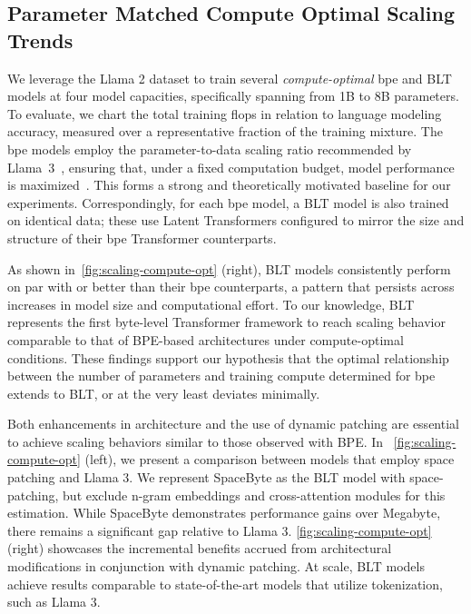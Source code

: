 \subsection{Parameter Matched Compute Optimal Scaling Trends}
\label{section:parameter-matched-scaling}
We leverage the Llama 2 dataset to train several \textit{compute-optimal} bpe and {\textsc BLT} models at four model capacities, specifically spanning from 1B to 8B parameters. To evaluate, we chart the total training flops in relation to language modeling accuracy, measured over a representative fraction of the training mixture. The bpe models employ the parameter-to-data scaling ratio recommended by Llama~3~\citep{dubey2024llama}, ensuring that, under a fixed computation budget, model performance is maximized~\citep{hoffmann2022training}. This forms a strong and theoretically motivated baseline for our experiments. Correspondingly, for each bpe model, a {\textsc BLT} model is also trained on identical data; these use Latent Transformers configured to mirror the size and structure of their bpe Transformer counterparts.

As shown in~\autoref{fig:scaling-compute-opt} (right), {\textsc BLT} models consistently perform on par with or better than their bpe counterparts, a pattern that persists across increases in model size and computational effort. To our knowledge, {\textsc BLT} represents the first byte-level Transformer framework to reach scaling behavior comparable to that of BPE-based architectures under compute-optimal conditions. These findings support our hypothesis that the optimal relationship between the number of parameters and training compute determined for bpe extends to {\textsc BLT}, or at the very least deviates minimally.

Both enhancements in architecture and the use of dynamic patching are essential to achieve scaling behaviors similar to those observed with BPE. In ~\autoref{fig:scaling-compute-opt} (left), we present a comparison between models that employ space patching and Llama 3. We represent SpaceByte \citep{slagle2024spacebyte} as the {\textsc BLT} model with space-patching, but exclude n-gram embeddings and cross-attention modules for this estimation. While SpaceByte demonstrates performance gains over Megabyte, there remains a significant gap relative to Llama 3. \autoref{fig:scaling-compute-opt} (right) showcases the incremental benefits accrued from architectural modifications in conjunction with dynamic patching. At scale, {\textsc BLT} models achieve results comparable to state-of-the-art models that utilize tokenization, such as Llama 3.

